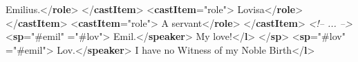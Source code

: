 \begin{reflist}
\begin{sansreflist}
\begin{reflist}
Emilius.{</\textbf{role}>}\mbox{}\newline 
{</\textbf{castItem}>}\mbox{}\newline 
{<\textbf{castItem}\hspace*{1em}{type}="{role}">}\mbox{}\newline 
{}Lovisa{</\textbf{role}>}\mbox{}\newline 
{</\textbf{castItem}>}\mbox{}\newline 
{<\textbf{castItem}\hspace*{1em}{type}="{role}">}\mbox{}\newline 
{}A servant{</\textbf{role}>}\mbox{}\newline 
{</\textbf{castItem}>}\mbox{}\newline 
\textit{<!-- ... -->}\mbox{}\newline 
{<\textbf{sp}\hspace*{1em}{who}="{\#emil}"\mbox{}\newline 
\hspace*{1em}{toWhom}="{\#lov}">}\mbox{}\newline 
{}Emil.{</\textbf{speaker}>}\mbox{}\newline 
{}My love!{</\textbf{l}>}\mbox{}\newline 
{</\textbf{sp}>}\mbox{}\newline 
{<\textbf{sp}\hspace*{1em}{who}="{\#lov}"\mbox{}\newline 
\hspace*{1em}{toWhom}="{\#emil}">}\mbox{}\newline 
{}Lov.{</\textbf{speaker}>}\mbox{}\newline 
{}I have no Witness of my Noble Birth{</\textbf{l}>}\mbox{}\newline 

\end{reflist}
\end{sansreflist}
\end{reflist}
